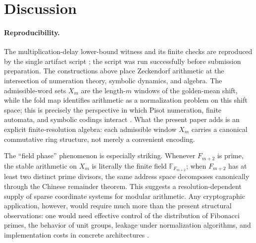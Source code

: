 \documentclass[12pt,a4paper]{article}
\theoremstyle{plain}
\theoremstyle{definition}
\numberwithin{equation}{section}
\begin{document}


\section{Discussion}\label{sec:discussion}
\paragraph{Reproducibility.}
The multiplication-delay lower-bound witness and its finite checks are reproduced by the single artifact script
; the script was run successfully before submission preparation.
The constructions above place Zeckendorf arithmetic at the intersection of numeration theory, symbolic dynamics, and algebra. The admissible-word sets \(X_m\) are the length-\(m\) windows of the golden-mean shift, while the fold map identifies arithmetic as a normalization problem on this shift space; this is precisely the perspective in which Pisot numeration, finite automata, and symbolic codings interact \cite{Blanchard1989Beta,Frougny1992NumbersAutomata,BerendFrougny1994Pisot,AlloucheShallit2003,LindMarcus1995,PytheasFogg2002}. What the present paper adds is an explicit finite-resolution algebra: each admissible window \(X_m\) carries a canonical commutative ring structure, not merely a convenient encoding.

The ``field phase'' phenomenon is especially striking. Whenever \(F_{m+2}\) is prime, the stable arithmetic on \(X_m\) is literally the finite field \(\mathbb{F}_{F_{m+2}}\); when \(F_{m+2}\) has at least two distinct prime divisors, the same address space decomposes canonically through the Chinese remainder theorem. This suggests a resolution-dependent supply of sparse coordinate systems for modular arithmetic. Any cryptographic application, however, would require much more than the present structural observations: one would need effective control of the distribution of Fibonacci primes, the behavior of unit groups, leakage under normalization algorithms, and implementation costs in concrete architectures \cite{Wall1960,Knuth1988FibonacciMultiplication,Koshy2018}.
\end{document}
